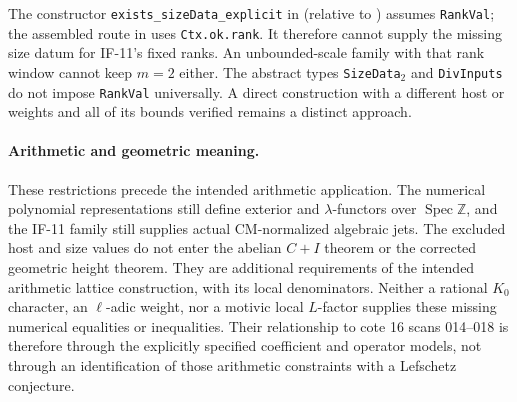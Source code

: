 The constructor \texttt{exists\_sizeData\_explicit} in
(relative to ) assumes
\texttt{RankVal}; the assembled route in
uses \texttt{Ctx.ok.rank}. It therefore cannot supply the
missing size datum for IF-11's fixed ranks. An unbounded-scale
family with that rank window cannot keep $m=2$ either.
The abstract types \texttt{SizeData}\(_2\) and
\texttt{DivInputs} do not impose \texttt{RankVal} universally.
A direct construction with a different host or weights and all
of its bounds verified remains a distinct approach.

\paragraph{Arithmetic and geometric meaning.}
These restrictions precede the intended arithmetic application.
The numerical polynomial representations still define exterior and
$\lambda$-functors over $\operatorname{Spec}\mathbb Z$, and the
IF-11 family still supplies actual CM-normalized algebraic jets.
The excluded host and size values do not enter the abelian
$C+I$ theorem or the corrected geometric height theorem. They
are additional requirements of the intended arithmetic lattice
construction, with its local denominators. Neither a rational
$K_0$ character, an $\ell$-adic weight, nor a motivic local
$L$-factor supplies these missing numerical equalities or
inequalities. Their relationship to cote 16 scans 014--018 is
therefore through the explicitly specified coefficient and
operator models, not through an identification of those
arithmetic constraints with a Lefschetz conjecture.
